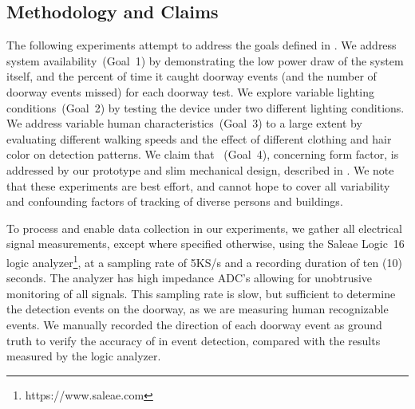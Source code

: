 \subsection{Methodology and Claims}
The following experiments attempt to address the goals defined in .
We address system availability~(Goal~1) by demonstrating the low power draw of the system itself, and the percent of time it caught doorway events (and the number of doorway events missed) for each doorway test.
We explore variable lighting conditions~(Goal~2) by testing the device under two different lighting conditions.
We address variable human characteristics~(Goal~3) to a large extent by evaluating different walking speeds and the effect of different clothing and hair color on detection patterns.
We claim that ~(Goal~4), concerning form factor, is addressed by our prototype and slim mechanical design, described in .
We note that these experiments are best effort, and cannot hope to cover all variability and confounding factors of tracking of diverse persons and buildings.

To process and enable data collection  in our experiments, we gather all electrical signal measurements, except where specified otherwise, using the Saleae Logic~16 logic analyzer\footnote{https://www.saleae.com}, at a sampling rate of 5KS/s and a recording duration of ten (10) seconds.
The analyzer has high impedance ADC's allowing for unobtrusive monitoring of all signals.
This sampling rate is slow, but sufficient to determine the detection events on the doorway, as we are measuring human recognizable events. 
We manually recorded the direction of each doorway event as ground truth to verify the accuracy of \sysname in event detection, compared with the results measured by the logic analyzer.




